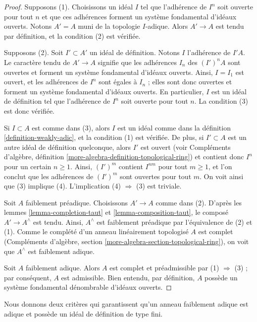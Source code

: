 \begin{proof}
Supposons (1). Choisissons un idéal $I$ tel que l'adhérence
de $I^n$ soit ouverte pour tout $n$ et que ces adhérences forment
un système fondamental d'idéaux ouverts. Notons $A' = A$ muni de
la topologie $I$-adique. Alors $A' \to A$ est tendu par définition,
et la condition (2) est vérifiée.

\medskip\noindent
Supposons (2). Soit $I' \subset A'$ un idéal de définition.
Notons $I$ l'adhérence de $I'A$. Le caractère tendu de $A' \to A$ signifie
que les adhérences $I_n$ des $(I')^nA$ sont ouvertes et forment un système fondamental
d'idéaux ouverts. Ainsi, $I = I_1$ est ouvert, et les adhérences de $I^n$
sont égales à $I_n$ ; elles sont donc ouvertes et forment un système fondamental
d'idéaux ouverts. En particulier, $I$ est un idéal de définition
tel que l'adhérence de $I^n$ soit ouverte pour tout $n$. La condition (3) est donc vérifiée.

\medskip\noindent
Si $I \subset A$ est comme dans (3), alors $I$ est un idéal comme dans
la définition \ref{definition-weakly-adic}, et la condition (1) est vérifiée.
De plus, si $I' \subset A$ est un autre idéal de définition quelconque, alors
$I'$ est ouvert (voir Compléments d'algèbre, définition
\ref{more-algebra-definition-topological-ring})
et contient donc $I^n$ pour un certain $n \geq 1$.
Ainsi, $(I')^m$ contient $I^{nm}$ pour tout $m \geq 1$, et l'on
conclut que les adhérences de $(I')^m$ sont ouvertes pour tout $m$.
On voit ainsi que (3) implique (4).
L'implication (4) $\Rightarrow$ (3) est triviale.

\medskip\noindent
Soit $A$ faiblement préadique. Choisissons $A' \to A$ comme dans (2).
D'après les lemmes \ref{lemma-completion-taut} et
\ref{lemma-composition-taut},
le composé $A' \to A^\wedge$ est tendu. Ainsi, $A^\wedge$
est faiblement préadique par l'équivalence de (2) et (1).
Comme le complété d'un anneau linéairement topologisé $A$ est complet
(Compléments d'algèbre, section \ref{more-algebra-section-topological-ring}),
on voit que $A^\wedge$ est faiblement adique.

\medskip\noindent
Soit $A$ faiblement adique. Alors $A$ est complet
et préadmissible par (1) $\Rightarrow$ (3) ; par conséquent, $A$
est admissible. Bien entendu, par définition, $A$ possède un système fondamental
dénombrable d'idéaux ouverts.
\end{proof}

\noindent
Nous donnons deux critères qui garantissent qu'un anneau faiblement adique
est adique et possède un idéal de définition de type fini.

